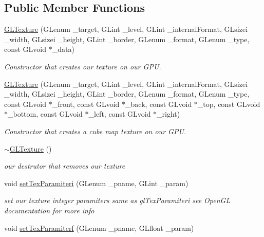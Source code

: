 \subsection*{Public Member Functions}
\begin{DoxyCompactItemize}
\item 
\hyperlink{class_g_l_texture_a1f0c33b32b1e37985976b6f10c2263c3}{G\-L\-Texture} (G\-Lenum \-\_\-target, G\-Lint \-\_\-level, G\-Lint \-\_\-internal\-Format, G\-Lsizei \-\_\-width, G\-Lsizei \-\_\-height, G\-Lint \-\_\-border, G\-Lenum \-\_\-format, G\-Lenum \-\_\-type, const G\-Lvoid $\ast$\-\_\-data)
\begin{DoxyCompactList}\small\item\em Constructor that creates our texture on our G\-P\-U. \end{DoxyCompactList}\item 
\hyperlink{class_g_l_texture_a0ec835c5a25261ce08b43b7a1601fc8f}{G\-L\-Texture} (G\-Lenum \-\_\-target, G\-Lint \-\_\-level, G\-Lint \-\_\-internal\-Format, G\-Lsizei \-\_\-width, G\-Lsizei \-\_\-height, G\-Lint \-\_\-border, G\-Lenum \-\_\-format, G\-Lenum \-\_\-type, const G\-Lvoid $\ast$\-\_\-front, const G\-Lvoid $\ast$\-\_\-back, const G\-Lvoid $\ast$\-\_\-top, const G\-Lvoid $\ast$\-\_\-bottom, const G\-Lvoid $\ast$\-\_\-left, const G\-Lvoid $\ast$\-\_\-right)
\begin{DoxyCompactList}\small\item\em Constructor that creates a cube map texture on our G\-P\-U. \end{DoxyCompactList}\item 
\hypertarget{class_g_l_texture_a7a0f04b3bd68c77588c0aea9b30b08c4}{\hyperlink{class_g_l_texture_a7a0f04b3bd68c77588c0aea9b30b08c4}{$\sim$\-G\-L\-Texture} ()}\label{class_g_l_texture_a7a0f04b3bd68c77588c0aea9b30b08c4}

\begin{DoxyCompactList}\small\item\em our destrutor that removes our texture \end{DoxyCompactList}\item 
\hypertarget{class_g_l_texture_add43b53521541bad76faec1cc5292048}{void \hyperlink{class_g_l_texture_add43b53521541bad76faec1cc5292048}{set\-Tex\-Paramiteri} (G\-Lenum \-\_\-pname, G\-Lint \-\_\-param)}\label{class_g_l_texture_add43b53521541bad76faec1cc5292048}

\begin{DoxyCompactList}\small\item\em set our texture integer paramiters same as gl\-Tex\-Paramiteri see Open\-G\-L documentation for more info \end{DoxyCompactList}\item 
\hypertarget{class_g_l_texture_a2a2d0c69601ba7843dd33def3f0d28a2}{void \hyperlink{class_g_l_texture_a2a2d0c69601ba7843dd33def3f0d28a2}{set\-Tex\-Paramiterf} (G\-Lenum \-\_\-pname, G\-Lfloat \-\_\-param)}\label{class_g_l_texture_a2a2d0c69601ba7843dd33def3f0d28a2}


\end{DoxyCompactItemize}
